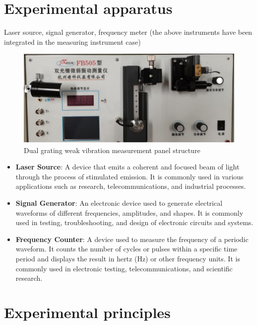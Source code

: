 \documentclass[UTF8]{article}
\begin{document}
	\section{Experimental apparatus}
	Laser source, signal generator, frequency meter (the above instruments have been integrated in the measuring instrument case)
	\begin{figure}[H]
	    	\centering
	    	\includegraphics[clip,scale=1,trim={0 0 0 0}]{fig/fig1.png}
	        \caption{Dual grating weak vibration measurement panel structure}
	        \label{figure.1}
    \end{figure}
	
	
	\begin{itemize}
	\item \textbf{Laser Source}: A device that emits a coherent and focused beam of light through the process of stimulated emission. It is commonly used in various applications such as research, telecommunications, and industrial processes.
	
	\item \textbf{Signal Generator}: An electronic device used to generate electrical waveforms of different frequencies, amplitudes, and shapes. It is commonly used in testing, troubleshooting, and design of electronic circuits and systems.
	
	\item \textbf{Frequency Counter}: A device used to measure the frequency of a periodic waveform. It counts the number of cycles or pulses within a specific time period and displays the result in hertz (Hz) or other frequency units. It is commonly used in electronic testing, telecommunications, and scientific research.
	\end{itemize}
    
        
	\section{Experimental principles}   
\end{document}
